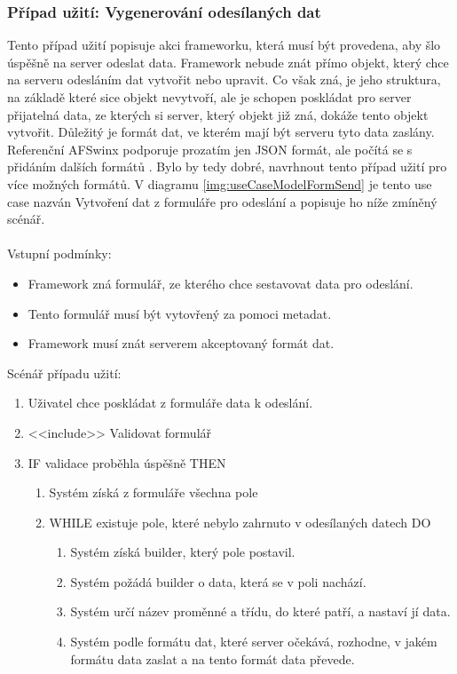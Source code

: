 \subsubsection{Případ užití: Vygenerování odesílaných dat}
Tento případ užití popisuje akci frameworku, která musí být provedena, aby šlo úspěšně na server odeslat data. Framework nebude znát přímo objekt, který chce na serveru odesláním dat vytvořit nebo upravit. Co však zná, je jeho struktura, na základě které sice objekt nevytvoří, ale je schopen poskládat pro server přijatelná data, ze kterých si server, který objekt již zná, dokáže tento objekt vytvořit. Důležitý je formát dat, ve kterém mají být serveru tyto data zaslány. Referenční AFSwinx podporuje prozatím jen JSON formát, ale počítá se s přidáním dalších formátů \cite{tomasek-thesis}. Bylo by tedy dobré, navrhnout tento případ užití pro více možných formátů. V diagramu \ref{img:useCaseModelFormSend} je tento use case nazván Vytvoření dat z formuláře pro odeslání a popisuje ho níže zmíněný scénář.\\\\
Vstupní podmínky:
\begin{itemize}
\item Framework zná formulář, ze kterého chce sestavovat data pro odeslání. 
\item Tento formulář musí být vytovřený za pomoci metadat. 
\item Framework musí znát serverem akceptovaný formát dat. 
\end{itemize}
Scénář případu užití:
\begin{enumerate}
\item Uživatel chce poskládat z formuláře data k odeslání.
\item <<include>> Validovat formulář
\item IF validace proběhla úspěšně THEN
\begin{enumerate}
\item Systém získá z formuláře všechna pole
\item WHILE existuje pole, které nebylo zahrnuto v odesílaných datech DO
\begin{enumerate}
\item Systém získá builder, který pole postavil.
\item Systém požádá builder o data, která se v poli nachází.
\item  Systém určí název proměnné a třídu, do které patří, a nastaví jí data.
\item  Systém podle formátu dat, které server očekává, rozhodne, v jakém formátu data zaslat a na tento formát data převede. 
\end{enumerate}
\end{enumerate}
\end{enumerate}

